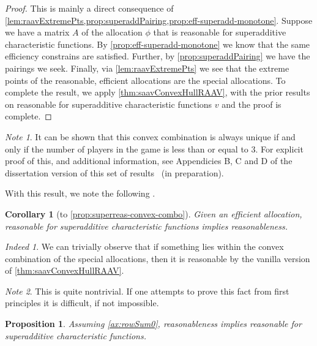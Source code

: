 \documentclass[12pt,letterpaper,final]{article}
\theoremstyle{plain}
\theoremstyle{plain}
\newtheorem{proposition}[theorem]{Proposition}
\theoremstyle{plain}
\theoremstyle{plain}
\theoremstyle{plain}
\newtheorem*{corollary}{Corollary}
\theoremstyle{plain}
\theoremstyle{plain}
\theoremstyle{definition}
\theoremstyle{definition}
\theoremstyle{definition}
\theoremstyle{definition}
\theoremstyle{definition}
\theoremstyle{remark}
\theoremstyle{remark}
\newtheorem*{note}{Note}
\theoremstyle{remark}
\theoremstyle{remark}
\newtheorem*{indeed}{Indeed}
\begin{document}
\begin{proof}
  This is mainly a direct consequence of
  \cref{lem:raavExtremePts,prop:superaddPairing,prop:eff-superadd-monotone}.
  Suppose we have a matrix \(A\) of the allocation \(\phi\) that is reasonable for
  superadditive characteristic functions. By
  \cref{prop:eff-superadd-monotone} we know that the same efficiency
  constrains are satisfied. Further, by \cref{prop:superaddPairing} we
  have the pairings we seek. Finally, via \cref{lem:raavExtremePts} we
  see that the extreme points of the reasonable, efficient
  allocations are the special allocations. To complete the result, we apply
  \cref{thm:saavConvexHullRAAV}, with the prior results on reasonable
  for superadditive characteristic functions \(v\) and the proof is complete.
\end{proof}

\begin{note}
  It can be shown that this convex combination is always unique if and
  only if the number
  of players in the game is less than or equal to \(3\). For
  explicit proof of this, and additional information, see Appendicies
  B, C and D of the dissertation
  version of this set of results~\cite{ClarkDis} (in preparation).
\end{note}

With this result, we note the following .

\begin{corollary}[to \cref{prop:superreas-convex-combo}]\label{cor:superreasreas}
  Given an efficient allocation, reasonable for superadditive
  characteristic functions implies reasonableness.
\end{corollary}

\begin{indeed}
  We can trivially observe that if something lies within the convex
  combination of the special allocations, then it is reasonable by the vanilla
  version of \cref{thm:saavConvexHullRAAV}.
\end{indeed}

\begin{note}
  This is quite nontrivial. If one attempts to prove this fact from first
  principles it is difficult, if not impossible.
\end{note}

\begin{proposition}
  Assuming \cref{ax:rowSum0}, reasonableness implies reasonable for
  superadditive characteristic functions.
\end{proposition}
\end{document}
